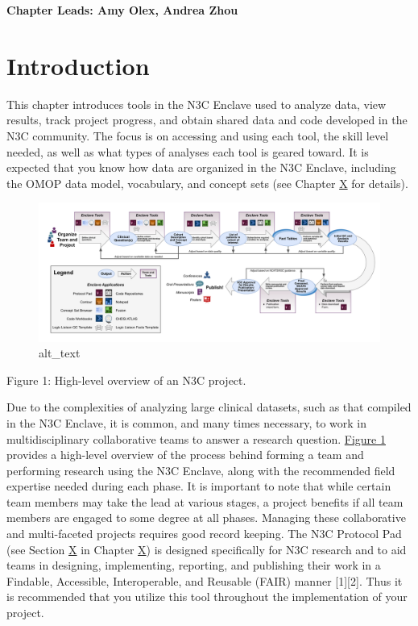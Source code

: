 \documentclass[
  letterpaper,
  DIV=11,
  numbers=noendperiod]{scrreprt}
\begin{document}
\textbf{Chapter Leads: Amy Olex, Andrea Zhou}

\hypertarget{introduction}{%
\section{Introduction}\label{introduction}}

This chapter introduces tools in the N3C Enclave used to analyze data,
view results, track project progress, and obtain shared data and code
developed in the N3C community. The focus is on accessing and using each
tool, the skill level needed, as well as what types of analyses each
tool is geared toward. It is expected that you know how data are
organized in the N3C Enclave, including the OMOP data model, vocabulary,
and concept sets (see Chapter
\protect\hyperlink{Understanding-the-Data}{X} for details).

\begin{figure}

{\centering \includegraphics{chapters/images/enclave-tools/Fig1_ProjOverview_ToolsChapter.png}

}

\caption{alt\_text}

\end{figure}

Figure 1: High-level overview of an N3C project.

Due to the complexities of analyzing large clinical datasets, such as
that compiled in the N3C Enclave, it is common, and many times
necessary, to work in multidisciplinary collaborative teams to answer a
research question.
\protect\hyperlink{Figure1_IntroToTools_hiRes.png}{Figure 1} provides a
high-level overview of the process behind forming a team and performing
research using the N3C Enclave, along with the recommended field
expertise needed during each phase. It is important to note that while
certain team members may take the lead at various stages, a project
benefits if all team members are engaged to some degree at all phases.
Managing these collaborative and multi-faceted projects requires good
record keeping. The N3C Protocol Pad (see Section
\protect\hyperlink{N3C-Protocol-Pad}{X} in Chapter
\protect\hyperlink{Best-Practices-and-Important-Data-Considerations}{X})
is designed specifically for N3C research and to aid teams in designing,
implementing, reporting, and publishing their work in a Findable,
Accessible, Interoperable, and Reusable (FAIR) manner {[}1{]}{[}2{]}.
Thus it is recommended that you utilize this tool throughout the
implementation of your project.
\end{document}
